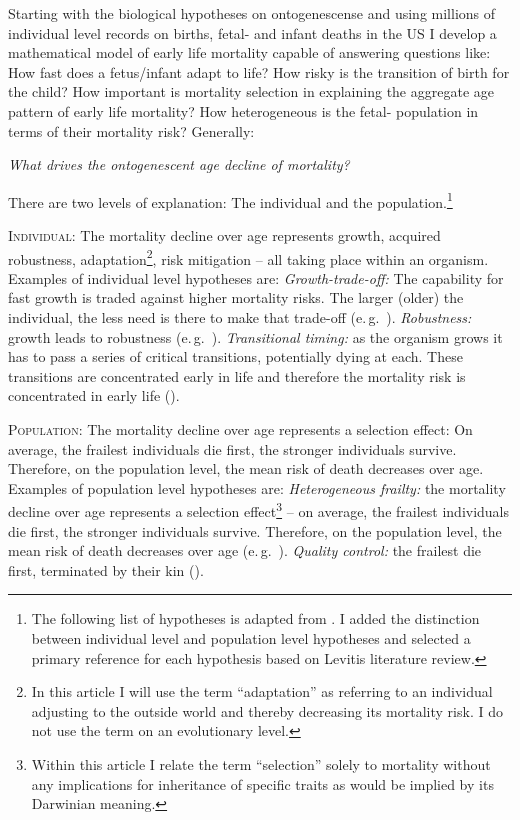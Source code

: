 \documentclass[
  12pt
]{scrartcl}
\begin{document}
Starting with the biological hypotheses on ontogenescense and using millions of individual level records on births, fetal- and infant deaths in the US I develop a mathematical model of early life mortality capable of answering questions like: How fast does a fetus/infant adapt to life? How risky is the transition of birth for the child? How important is mortality selection in explaining the aggregate age pattern of early life mortality? How heterogeneous is the fetal- population in terms of their mortality risk? Generally:

\begin{center}
  \emph{What drives the ontogenescent age decline of mortality?}
\end{center}

There are two levels of explanation: The individual and the population.\footnote{The following list of hypotheses is adapted from \cite{Levitis2011}. I added the distinction between individual level and population level hypotheses and selected a primary reference for each hypothesis based on Levitis literature review.}

\textsc{Individual:} The mortality decline over age represents growth, acquired robustness, adaptation\footnote{In this article I will use the term \enquote{adaptation} as referring to an individual adjusting to the outside world and thereby decreasing its mortality risk. I do not use the term on an evolutionary level.}, risk mitigation -- all taking place within an organism. Examples of individual level hypotheses are:
  \emph{Growth-trade-off:} The capability for fast growth is traded against higher mortality risks. The larger (older) the individual, the less need is there to make that trade-off (e.\,g.~\cite{Chu2008}).
  \emph{Robustness:} growth leads to robustness (e.\,g.~\cite{Munch2006}).
  \emph{Transitional timing:} as the organism grows it has to pass a series of critical transitions, potentially dying at each. These transitions are concentrated early in life and therefore the mortality risk is concentrated in early life (\cite{Levitis2011}).

\textsc{Population:} The mortality decline over age represents a selection effect: On average, the frailest individuals die first, the stronger individuals survive. Therefore, on the population level, the mean risk of death decreases over age. Examples of population level hypotheses are:
  \emph{Heterogeneous frailty:} the mortality decline over age represents a selection effect\footnote{Within this article I relate the term \enquote{selection} solely to mortality without any implications for inheritance of specific traits as would be implied by its Darwinian meaning.} -- on average, the frailest individuals die first, the stronger individuals survive. Therefore, on the population level, the mean risk of death decreases over age (e.\,g.~\cite{Vaupel1985}).
  \emph{Quality control:} the frailest die first, terminated by their kin (\cite{Hamilton1966}).
\end{document}
